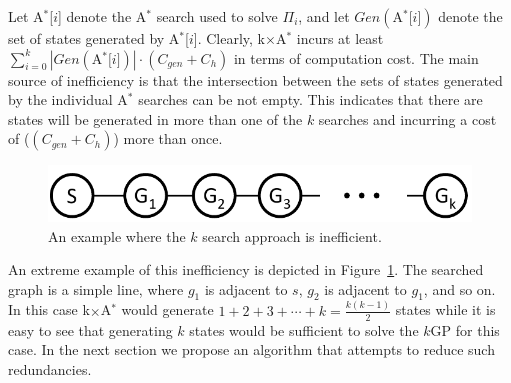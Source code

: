 \documentclass{aicom2e}
\newcommand{\kgs}{$k$GP}
\newcommand{\astar}{A$^*$}
\newcommand{\kxastar}{k$\times$A$^*$}
\newcommand{\astari}[1]{A$^*$[$#1$]}
\newcommand{\open}{\textsc{Open}}
\begin{document}


Let \astari{i} denote the \astar{} search used to solve $\Pi_i$, and let
$Gen(\text{\astari{i}})$ denote the set of states generated by \astari{i}.
Clearly, \kxastar{} incurs at least $\sum_{i=0}^k
|Gen(\text{\astari{i}})|\cdot(C_{gen}+C_{h})$ in terms of
computation cost. The main source of inefficiency is that the intersection
between the sets of states generated by the individual \astar{} searches can be
not empty. This indicates that there are states will be generated in more than
one of the $k$ searches and incurring a cost of 
($(C_{gen}+C_{h})$) more than once.

\begin{figure}
    \includegraphics[width=\columnwidth]{k-search-bad_cropped}
    \caption{An example where the $k$ search approach is inefficient.}
    \label{fig:k-search-bad}
\end{figure}

An extreme example of this inefficiency is depicted in
Figure~\ref{fig:k-search-bad}. The searched graph is a simple line, where $g_1$
is adjacent to $s$, $g_2$ is adjacent to $g_1$, and so on. In this case
\kxastar{} would generate $1+2+3+\cdots+k=\frac{k(k-1)}{2}$ states while it is easy to
see that generating $k$ states would be sufficient to solve the \kgs{} for this
case.
In the next section we propose an algorithm that attempts to reduce such redundancies. %


\end{document}
